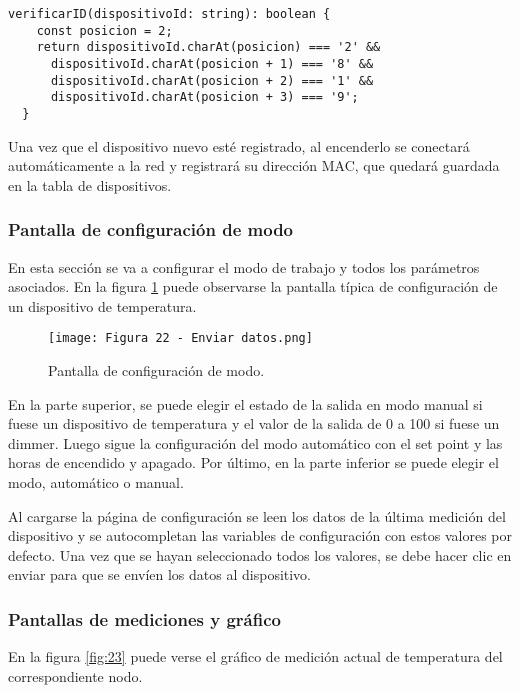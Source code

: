 \begin{lstlisting}[caption={Verificación de ID.}, label={lst:Verificación de ID}]
verificarID(dispositivoId: string): boolean {
    const posicion = 2;
    return dispositivoId.charAt(posicion) === '2' &&
      dispositivoId.charAt(posicion + 1) === '8' &&
      dispositivoId.charAt(posicion + 2) === '1' &&
      dispositivoId.charAt(posicion + 3) === '9';
  }
\end{lstlisting}

Una vez que el dispositivo nuevo esté registrado, al encenderlo se conectará automáticamente a la red y registrará su dirección MAC, que quedará guardada en la tabla de dispositivos.

\subsubsection{Pantalla de configuración de modo}

En esta sección se va a configurar el modo de trabajo y todos los parámetros asociados. En la figura \ref{fig:22} puede observarse la pantalla típica de configuración de un dispositivo de temperatura.

\newpage
\begin{figure}[h]
\centering
\texttt{[image: Figura 22 - Enviar datos.png]}
\caption[Pantalla de configuración de modo]{Pantalla de configuración de modo.}
\label{fig:22}
\end{figure}

En la parte superior, se puede elegir el estado de la salida en modo manual si fuese un dispositivo de temperatura y el valor de la salida de 0 a 100 si fuese un dimmer. Luego sigue la configuración del modo automático con el set point y las horas de encendido y apagado. Por último, en la parte inferior se puede elegir el modo, automático o manual.

Al cargarse la página de configuración se leen los datos de la última medición del dispositivo y se autocompletan las variables de configuración con estos valores por defecto. Una vez que se hayan seleccionado todos los valores, se debe hacer clic en enviar para que se envíen los datos al dispositivo.

\subsubsection{Pantallas de mediciones y gráfico}

En la figura \ref{fig:23} puede verse el gráfico de medición actual de temperatura del correspondiente nodo.

